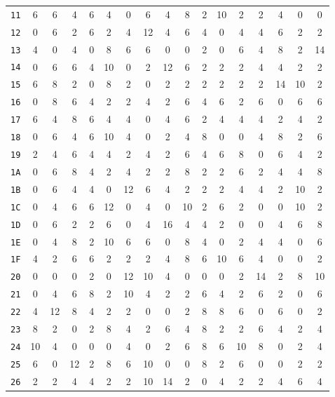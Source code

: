 \begin{center}
\begin{small}
\begin{longtable}{c|cccccccccccccccc}
\texttt{11} & 6 & 6 & 4 & 6 & 4 & 0 & 6 & 4 & 8 & 2 & 10 & 2 & 2 & 4 & 0 & 0 \\
\texttt{12} & 0 & 6 & 2 & 6 & 2 & 4 & 12 & 4 & 6 & 4 & 0 & 4 & 4 & 6 & 2 & 2 \\
\texttt{13} & 4 & 0 & 4 & 0 & 8 & 6 & 6 & 0 & 0 & 2 & 0 & 6 & 4 & 8 & 2 & 14 \\
\texttt{14} & 0 & 6 & 6 & 4 & 10 & 0 & 2 & 12 & 6 & 2 & 2 & 2 & 4 & 4 & 2 & 2 \\
\texttt{15} & 6 & 8 & 2 & 0 & 8 & 2 & 0 & 2 & 2 & 2 & 2 & 2 & 2 & 14 & 10 & 2 \\
\texttt{16} & 0 & 8 & 6 & 4 & 2 & 2 & 4 & 2 & 6 & 4 & 6 & 2 & 6 & 0 & 6 & 6 \\
\texttt{17} & 6 & 4 & 8 & 6 & 4 & 4 & 0 & 4 & 6 & 2 & 4 & 4 & 4 & 2 & 4 & 2 \\
\texttt{18} & 0 & 6 & 4 & 6 & 10 & 4 & 0 & 2 & 4 & 8 & 0 & 0 & 4 & 8 & 2 & 6 \\
\texttt{19} & 2 & 4 & 6 & 4 & 4 & 2 & 4 & 2 & 6 & 4 & 6 & 8 & 0 & 6 & 4 & 2 \\
\texttt{1A} & 0 & 6 & 8 & 4 & 2 & 4 & 2 & 2 & 8 & 2 & 2 & 6 & 2 & 4 & 4 & 8 \\
\texttt{1B} & 0 & 6 & 4 & 4 & 0 & 12 & 6 & 4 & 2 & 2 & 2 & 4 & 4 & 2 & 10 & 2 \\
\texttt{1C} & 0 & 4 & 6 & 6 & 12 & 0 & 4 & 0 & 10 & 2 & 6 & 2 & 0 & 0 & 10 & 2 \\
\texttt{1D} & 0 & 6 & 2 & 2 & 6 & 0 & 4 & 16 & 4 & 4 & 2 & 0 & 0 & 4 & 6 & 8 \\
\texttt{1E} & 0 & 4 & 8 & 2 & 10 & 6 & 6 & 0 & 8 & 4 & 0 & 2 & 4 & 4 & 0 & 6 \\
\texttt{1F} & 4 & 2 & 6 & 6 & 2 & 2 & 2 & 4 & 8 & 6 & 10 & 6 & 4 & 0 & 0 & 2 \\
\texttt{20} & 0 & 0 & 0 & 2 & 0 & 12 & 10 & 4 & 0 & 0 & 0 & 2 & 14 & 2 & 8 & 10 \\
\texttt{21} & 0 & 4 & 6 & 8 & 2 & 10 & 4 & 2 & 2 & 6 & 4 & 2 & 6 & 2 & 0 & 6 \\
\texttt{22} & 4 & 12 & 8 & 4 & 2 & 2 & 0 & 0 & 2 & 8 & 8 & 6 & 0 & 6 & 0 & 2 \\
\texttt{23} & 8 & 2 & 0 & 2 & 8 & 4 & 2 & 6 & 4 & 8 & 2 & 2 & 6 & 4 & 2 & 4 \\
\texttt{24} & 10 & 4 & 0 & 0 & 0 & 4 & 0 & 2 & 6 & 8 & 6 & 10 & 8 & 0 & 2 & 4 \\
\texttt{25} & 6 & 0 & 12 & 2 & 8 & 6 & 10 & 0 & 0 & 8 & 2 & 6 & 0 & 0 & 2 & 2 \\
\texttt{26} & 2 & 2 & 4 & 4 & 2 & 2 & 10 & 14 & 2 & 0 & 4 & 2 & 2 & 4 & 6 & 4 \\

\end{longtable}
\end{small}
\end{center}
